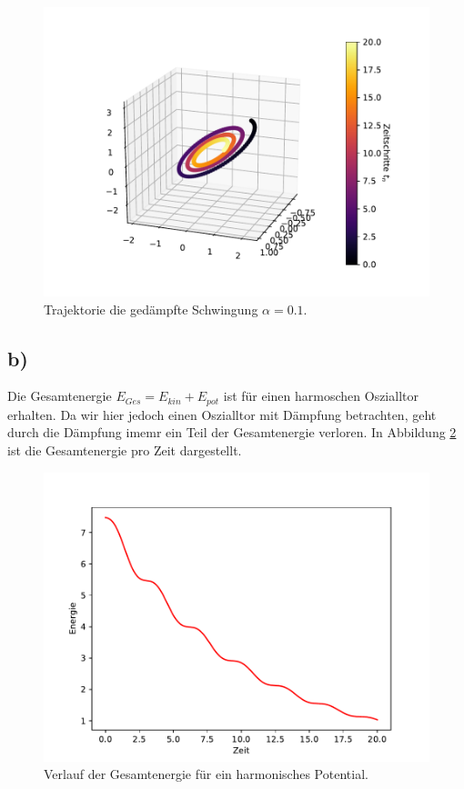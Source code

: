 \begin{figure}[H]
  \centering
  \includegraphics[scale=0.7]{A2/build/Plots/aufg1_a4.pdf}
  \caption{Trajektorie die gedämpfte Schwingung $\alpha = 0.1$.}
  \label{fig:gedämpft}
\end{figure}

\subsection*{b)}
Die Gesamtenergie $E_{Ges} = E_{kin} + E_{pot}$ ist für einen harmoschen Oszialltor erhalten. Da wir hier jedoch einen Oszialltor mit Dämpfung betrachten, geht durch die Dämpfung imemr ein Teil der Gesamtenergie verloren.
In Abbildung \ref{fig:energie} ist die Gesamtenergie pro Zeit dargestellt.

\begin{figure}
  \centering
  \includegraphics[scale=0.7]{A2/build/Plots/Energie.pdf}
  \caption{Verlauf der Gesamtenergie für ein harmonisches Potential.}
  \label{fig:energie}
\end{figure}

